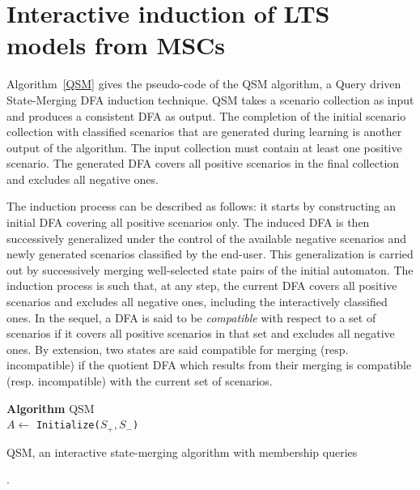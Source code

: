 \section{Interactive induction of LTS models from MSCs\label{section:lts-induction-from-mscs}}

Algorithm~\ref{QSM} gives the pseudo-code of the \textsc{QSM} algorithm, a Query driven State-Merging DFA induction technique. \textsc{QSM} takes a scenario collection as input and produces a consistent DFA as output. The completion of the initial scenario collection with classified scenarios that are generated during learning is another output of the algorithm. The input collection must contain at least one positive scenario. The generated DFA covers all positive scenarios in the final collection and excludes all negative ones. 

The induction process can be described as follows: it starts by constructing an initial DFA covering all positive scenarios only. The induced DFA is then successively generalized under the control of the available negative scenarios and newly generated scenarios classified by the end-user. This generalization is carried out by successively merging well-selected state pairs of the initial automaton. The induction process is such that, at any step, the current DFA covers all positive scenarios and excludes all negative ones, including the interactively classified ones. In the sequel, a DFA is said to be \textsl{compatible} with respect to a set of scenarios if it covers all positive scenarios in that set and excludes all negative ones. By extension, two states are said compatible for merging (resp. incompatible) if the quotient DFA which results from their merging is compatible (resp. incompatible) with the current set of scenarios.

\begin{algorithm}[H]
{
\textbf{Algorithm} \textsc{QSM}\\
$A \leftarrow $ {\tt Initialize($S_+, S_-$)}\\
}
\caption{\textsc{QSM}, an interactive state-merging algorithm with membership queries\label{QSM}}.
\end{algorithm}

